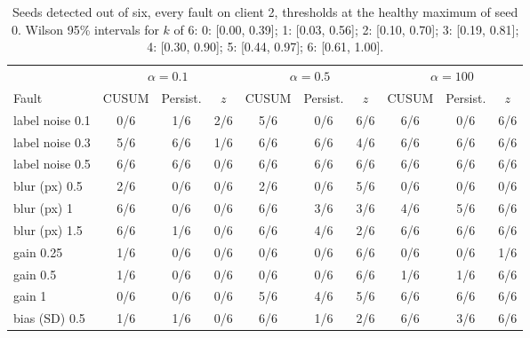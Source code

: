 \begin{table}[H]
\centering
\small
\setlength{\tabcolsep}{3.5pt}
\begin{tabular}{lccccccccc}
\toprule
 & \multicolumn{3}{c}{$\alpha = 0.1$} & \multicolumn{3}{c}{$\alpha = 0.5$} & \multicolumn{3}{c}{$\alpha = 100$} \\
\cmidrule(lr){2-4}\cmidrule(lr){5-7}\cmidrule(lr){8-10}
Fault & CUSUM & Persist. & $z$ & CUSUM & Persist. & $z$ & CUSUM & Persist. & $z$ \\
\midrule
label noise 0.1 & 0/6 & 1/6 & 2/6 & 5/6 & 0/6 & 6/6 & 6/6 & 0/6 & 6/6 \\
label noise 0.3 & 5/6 & 6/6 & 1/6 & 6/6 & 6/6 & 4/6 & 6/6 & 6/6 & 6/6 \\
label noise 0.5 & 6/6 & 6/6 & 0/6 & 6/6 & 6/6 & 6/6 & 6/6 & 6/6 & 6/6 \\
blur (px) 0.5 & 2/6 & 0/6 & 0/6 & 2/6 & 0/6 & 5/6 & 0/6 & 0/6 & 0/6 \\
blur (px) 1 & 6/6 & 0/6 & 0/6 & 6/6 & 3/6 & 3/6 & 4/6 & 5/6 & 6/6 \\
blur (px) 1.5 & 6/6 & 1/6 & 0/6 & 6/6 & 4/6 & 2/6 & 6/6 & 6/6 & 6/6 \\
gain 0.25 & 1/6 & 0/6 & 0/6 & 0/6 & 0/6 & 6/6 & 0/6 & 0/6 & 1/6 \\
gain 0.5 & 1/6 & 0/6 & 0/6 & 0/6 & 0/6 & 6/6 & 1/6 & 1/6 & 6/6 \\
gain 1 & 0/6 & 0/6 & 0/6 & 5/6 & 4/6 & 5/6 & 6/6 & 6/6 & 6/6 \\
bias (SD) 0.5 & 1/6 & 1/6 & 0/6 & 6/6 & 1/6 & 2/6 & 6/6 & 3/6 & 6/6 \\
\bottomrule
\end{tabular}
\caption{Seeds detected out of six, every fault on client 2, thresholds at the healthy maximum of seed 0. Wilson 95\% intervals for $k$ of 6: 0: [0.00, 0.39]; 1: [0.03, 0.56]; 2: [0.10, 0.70]; 3: [0.19, 0.81]; 4: [0.30, 0.90]; 5: [0.44, 0.97]; 6: [0.61, 1.00].}
\label{tab:grid}
\end{table}
